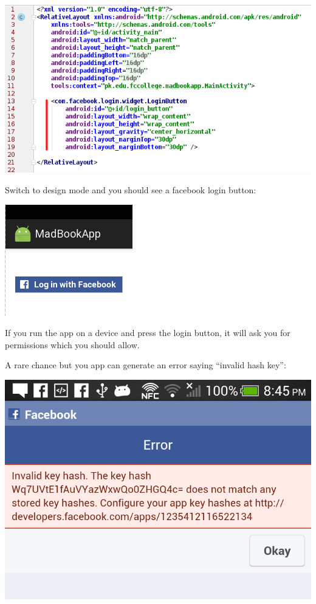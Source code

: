 \begin{center}
	\includegraphics[scale=\SourceCodeScale]{chapters/ch12/images/20}
\end{center}

Switch to design mode and you should see a facebook login button:

\begin{center}
	\includegraphics[scale=\SourceCodeScale]{chapters/ch12/images/21}
\end{center}

If you run the app on a device and press the login button, it will ask you for permissions which you should allow. 

A rare chance but you app can generate an error saying ``invalid hash key'':

\begin{center}
	\includegraphics[scale=0.20]{chapters/ch12/images/22}
\end{center}

